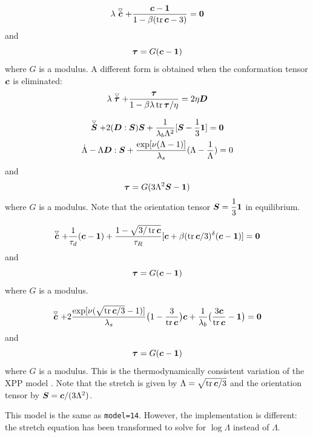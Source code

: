 \[
  \lambda\stackrel{\scriptscriptstyle\bigtriangledown}{\boldsymbol{c}}
         +\frac{\boldsymbol{c}-\boldsymbol{1}}{1-\beta(\operatorname{tr}\boldsymbol{c}-3)}=\boldsymbol{0}
\]
and
\[
     \boldsymbol{\tau}=G(\boldsymbol{c} - \boldsymbol{1})
\]
where $G$ is a modulus. A different form is obtained when
the conformation tensor $\boldsymbol{c}$ is eliminated:
\[
  \lambda\stackrel{\scriptscriptstyle\bigtriangledown}{\boldsymbol{\tau}}
         +\frac{\boldsymbol{\tau}}{1-\beta\lambda\operatorname{tr}\boldsymbol{\tau}/\eta}=2\eta\boldsymbol{D}
\]

\begin{gather*}
  \stackrel{\scriptscriptstyle\bigtriangledown}{\boldsymbol{S}}+2(\boldsymbol{D}:\boldsymbol{S})\boldsymbol{S}
         +\frac1{\lambda_b\Lambda^2}[\boldsymbol{S}-\frac13\boldsymbol{1}]=\boldsymbol{0}\\
  \dot\Lambda - \Lambda \boldsymbol{D}:\boldsymbol{S} +
         \frac{\exp[\nu(\Lambda-1)]}{\lambda_s}(\Lambda-\frac1\Lambda) = 0
\end{gather*}
and
\[
     \boldsymbol{\tau}=G(3\Lambda^2\boldsymbol{S} - \boldsymbol{1})
\]
where $G$ is a modulus. Note that the orientation tensor
 $\boldsymbol{S}=\dfrac13\boldsymbol{1}$ in equilibrium.

\medskip
\[
  \stackrel{\scriptscriptstyle\bigtriangledown}{\boldsymbol{c}}
  + \frac1{\tau_d}(\boldsymbol{c} - \boldsymbol{1})
 +\frac{1-\sqrt{3/\operatorname{tr}\boldsymbol{c}}}{\tau_R}[\boldsymbol{c}+
       \beta(\operatorname{tr}\boldsymbol{c}/3)^\delta (\boldsymbol{c}-\boldsymbol{1})]=\boldsymbol{0}
\]
and
\[
     \boldsymbol{\tau}=G(\boldsymbol{c} - \boldsymbol{1})
\]
where $G$ is a modulus. 

\label{sec:XPPmodel}
\medskip
\[
  \stackrel{\scriptscriptstyle\bigtriangledown}{\boldsymbol{c}}
 +2\frac{\exp[\nu(\sqrt{\operatorname{tr}\boldsymbol{c}/3}-1)]}{\lambda_s}
     \big(1-\frac3{\operatorname{tr}\boldsymbol{c}}\big)\boldsymbol{c}
   +\frac1{\lambda_b}\big(\frac{3{\boldsymbol{c}}}{\operatorname{tr}\boldsymbol{c}}-\boldsymbol{1}\big)=\boldsymbol{0}
\]
and
\[
     \boldsymbol{\tau}=G(\boldsymbol{c} - \boldsymbol{1})
\]
where $G$ is a modulus. This is the thermodynamically consistent variation of the XPP model \cite{verbeeten2004numerical}. 
Note that the stretch is given by $\Lambda=\sqrt{\operatorname{tr}\boldsymbol{c}/3}$ and the
orientation tensor by $\boldsymbol{S}=\boldsymbol{c}/(3\Lambda^2)$.

This model is the same as \texttt{model=14}. However, the implementation is
different: the stretch equation has been transformed to solve for $\log\Lambda$
instead of $\Lambda$.

